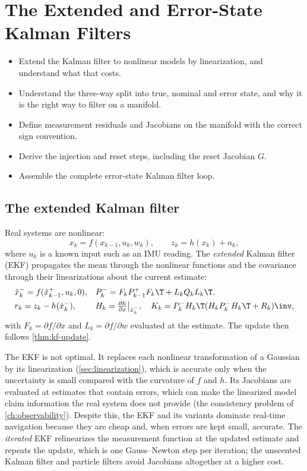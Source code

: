 \chapter{The Extended and Error-State Kalman Filters}
\label{ch:eskf}

\begin{objectives}
\begin{itemize}
  \item Extend the Kalman filter to nonlinear models by linearization, and understand what that costs.
  \item Understand the three-way split into true, nominal and error state, and why it is the right way
        to filter on a manifold.
  \item Define measurement residuals and Jacobians on the manifold with the correct sign convention.
  \item Derive the injection and reset steps, including the reset Jacobian $G$.
  \item Assemble the complete error-state Kalman filter loop.
\end{itemize}
\end{objectives}

\section{The extended Kalman filter}

Real systems are nonlinear:
\begin{equation}
  x_k = f(x_{k-1}, u_k, w_k), \qquad z_k = h(x_k) + n_k,
\end{equation}
where $u_k$ is a known input such as an IMU reading. The \emph{extended} Kalman filter (EKF) propagates the
mean through the nonlinear functions and the covariance through their linearizations about the current
estimate:
\begin{align}
  &\hat x_k^- = f(\hat x_{k-1}^+, u_k, 0), &
  &P_k^- = F_k P_{k-1}^+ F_k\T + L_k Q_k L_k\T, \\
  &r_k = z_k - h(\hat x_k^-), &
  &H_k = \tfrac{\partial h}{\partial x}\big|_{\hat x_k^-},\quad K_k = P_k^- H_k\T(H_kP_k^-H_k\T + R_k)\inv,
\end{align}
with $F_k = \partial f/\partial x$ and $L_k = \partial f/\partial w$ evaluated at the estimate. The update then
follows \cref{thm:kf-update}.

The EKF is not optimal. It replaces each nonlinear transformation of a Gaussian by its linearization
(\cref{sec:linearization}), which is accurate only when the uncertainty is small compared with the
curvature of $f$ and $h$. Its Jacobians are evaluated at estimates that contain errors, which can make the
linearized model claim information the real system does not provide (the consistency problem of
\cref{ch:observability}). Despite this, the EKF and its variants dominate real-time navigation because they
are cheap and, when errors are kept small, accurate. The \emph{iterated} EKF relinearizes the measurement
function at the updated estimate and repeats the update, which is one Gauss--Newton step per iteration;
the unscented Kalman filter and particle filters avoid Jacobians altogether at a higher cost.

